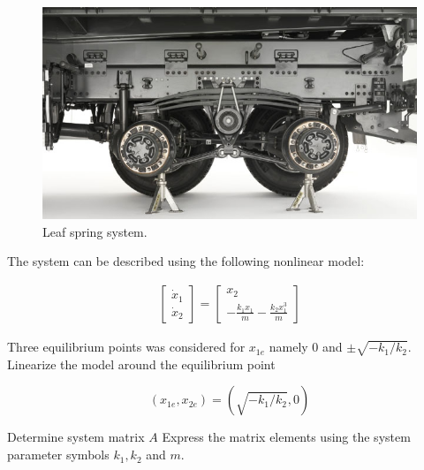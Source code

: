 \begin{figure}[!htb]
\begin{center}
\includegraphics[scale=0.280]{img/state_feedback/Image_LeafSpringSuspension_01.jpg}
\end{center}
\caption{Leaf spring system.}
\label{Image_LeafSpringSuspension_01}
\end{figure}

The system can be described using the following nonlinear model: 


\begin{eqnarray}
\begin{bmatrix}
 \dot{x}_1\\
 \dot{x}_2
\end{bmatrix}= 
\begin{bmatrix}
 x_2  \\
 -\frac{k_1 x_1}{m} - \frac{k_2 x_{1}^3}{m}  
\end{bmatrix}
\end{eqnarray}

Three equilibrium points was considered for $x_{1e}$ namely $0$ and $\pm \sqrt{-k_1/k_2}$. Linearize the model around the equilibrium point

\begin{equation}
(x_{1e}, x_{2e} ) = (\sqrt{-k_1/k_2}, 0) \nonumber
\end{equation}


Determine system matrix $A$ Express the matrix elements using the system parameter symbols $k_1, k_2$ and $m$. 
































